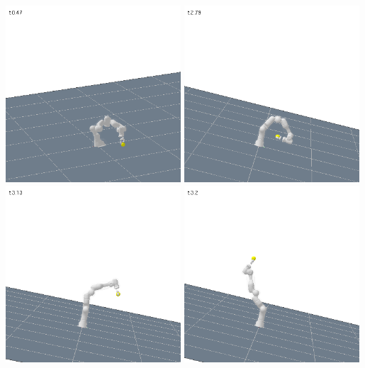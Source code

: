 \documentclass[12pt,pdftex,a4paper]{article}
\begin{document}
\begin{center}
\includegraphics[width=0.49\textwidth]{week26_1.png}
\includegraphics[width=0.49\textwidth]{week26_2.png}
\includegraphics[width=0.49\textwidth]{week26_3.png}
\includegraphics[width=0.49\textwidth]{week26_4.png}
\end{center}
\end{document}
